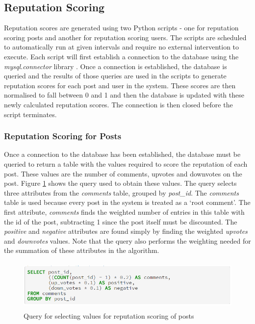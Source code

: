 \subsection{Reputation Scoring}
Reputation scores are generated using two Python scripts - one for reputation scoring posts and another for reputation scoring users. The scripts are scheduled to automatically run at given intervals and require no external intervention to execute. Each script will first establish a connection to the database using the \emph{mysql.connector} library \cite{MySQL:MySQLConnector}. Once a connection is established, the database is queried and the results of those queries are used in the scripts to generate reputation scores for each post and user in the system. These scores are then normalised to fall between 0 and 1 and then the database is updated with these newly calculated reputation scores. The connection is then closed before the script terminates.

\subsubsection{Reputation Scoring for Posts}
Once a connection to the database has been established, the database must be queried to return a table with the values required to score the reputation of each post. These values are the number of comments, upvotes and downvotes on the post. Figure \ref{fig:PostRepQuery} shows the query used to obtain these values. The query selects three attributes from the \emph{comments} table, grouped by \emph{post\_id}. The \emph{comments} table is used because every post in the system is treated as a `root comment'. The first attribute, \emph{comments} finds the weighted number of entries in this table with the id of the post, subtracting 1 since the post itself must be discounted. The \emph{positive} and \emph{negative} attributes are found simply by finding the weighted \emph{upvotes} and \emph{downvotes} values. Note that the query also performs the weighting needed for the summation of these attributes in the algorithm.

\begin{figure}[H]
\centering
\includegraphics[height=1in]{Images/Implementation/PostRepQuery}
\caption{Query for selecting values for reputation scoring of posts}
\label{fig:PostRepQuery}
\end{figure}

